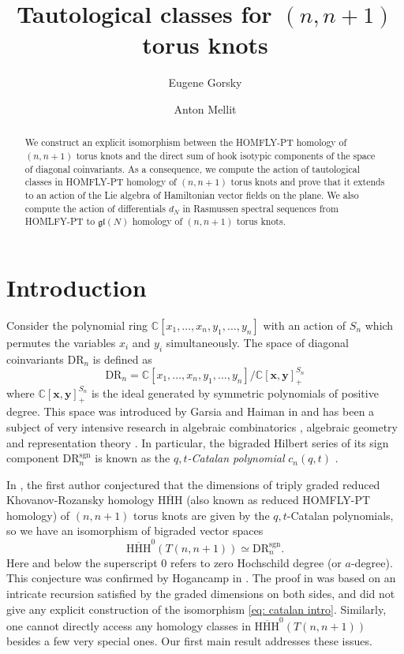 \documentclass{amsart}
\title{Tautological classes for $(n,n+1)$ torus knots}
\author{Eugene Gorsky}
\author{Anton Mellit}
\newcommand{\C}{\mathbb{C}}
\newcommand{\xx}{\mathbf{x}}
\newcommand{\yy}{\mathbf{y}}
\newcommand{\DR}{\mathrm{DR}}
\newcommand{\sgn}{\mathrm{sgn}}
\newcommand{\HHH}{\mathrm{HHH}}
\numberwithin{equation}{section}
\theoremstyle{definition}
\begin{document}
\begin{abstract}
We construct an explicit isomorphism between the HOMFLY-PT homology of $(n,n+1)$ torus knots and the direct sum of hook isotypic components of the space of diagonal coinvariants. As a consequence, we compute the action of tautological classes in   HOMFLY-PT homology of $(n,n+1)$ torus knots and prove that it extends to an action of the Lie algebra of Hamiltonian vector fields on the plane. We also compute the action of differentials $d_N$ in Rasmussen spectral sequences from HOMLFY-PT to $\mathfrak{gl}(N)$ homology of  $(n,n+1)$ torus knots. 
\end{abstract}

\maketitle

\section{Introduction}

Consider the polynomial ring $\C[x_1,\ldots,x_n,y_1,\ldots,y_n]$ with an action of $S_n$ which permutes the variables $x_i$ and $y_i$ simultaneously. The space of diagonal coinvariants $\DR_n$ is defined as 
$$
\DR_n=\C[x_1,\ldots,x_n,y_1,\ldots,y_n]/\C[\xx,\yy]^{S_n}_+
$$
where $\C[\xx,\yy]^{S_n}_+$ is the ideal generated by symmetric polynomials of positive degree. This space was introduced by Garsia and Haiman in \cite{Garsia} and has been a subject of very intensive research in algebraic combinatorics \cite{Shuffle,ShufflePf}, algebraic geometry \cite{HaimanInv,CO,Hikita} and representation theory \cite{Gordon}. In particular, the bigraded Hilbert series of its sign component $\DR_n^{\sgn}$ is known as the {\em $q,t$-Catalan polynomial} $c_n(q,t)$ \cite{Garsia}.

In \cite{G}, the first author conjectured that the dimensions of triply graded reduced Khovanov-Rozansky homology  $\overline{\HHH}$ (also known as reduced HOMFLY-PT homology) of $(n,n+1)$ torus knots are given by the $q,t$-Catalan polynomials, so we have an isomorphism of bigraded vector spaces
\begin{equation}
\label{eq: catalan intro}
\overline{\HHH}^0(T(n,n+1))\simeq \DR_n^{\sgn}.
\end{equation}
Here and below the superscript $0$ refers to zero Hochschild degree (or $a$-degree).
This conjecture was confirmed by Hogancamp in \cite{H}.
The proof in \cite{H} was based on an intricate recursion satisfied by the graded dimensions on both sides, and did not give any explicit construction of the isomorphism \eqref{eq: catalan intro}.
Similarly, one cannot directly access any homology classes in $\overline{\HHH}^0(T(n,n+1))$ besides a few very special ones. Our first main result addresses these issues.
\end{document}
